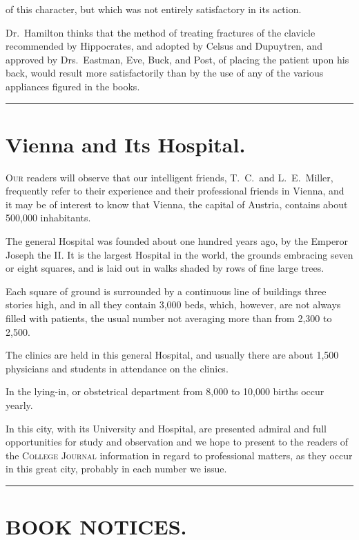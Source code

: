 of this character, but which was not entirely satisfactory in its
action.

Dr.~Hamilton thinks that the method of treating fractures of the clavicle
recommended by Hippocrates, and adopted by Celsus and Dupuytren,
and approved by Drs.~Eastman, Eve, Buck, and Post, of placing the
patient upon his back, would result more satisfactorily than by the use
of any of the various appliances figured in the books.

\fancybreak{*}

\section*{Vienna and Its Hospital.}

\lettrine[lines=1]{}{Our} readers will observe that our intelligent friends,  T.~C.\ and
L.~E.\ Miller, frequently refer to their experience and their professional
friends in Vienna, and it may be of interest to know that Vienna, the
capital of Austria, contains about 500,000 inhabitants.

The general Hospital was founded about one hundred years ago, by
the Emperor Joseph the II. It is the largest Hospital in the world,
the grounds embracing seven or eight squares, and is laid out in walks
shaded by rows of fine large trees.

Each square of ground is surrounded by a continuous line of buildings
three stories high, and in all they contain 3,000 beds, which, however,
are not always filled with patients, the usual number not averaging
more than from 2,300 to 2,500.

The clinics are held in this general Hospital, and usually there are
about 1,500 physicians and students in attendance on the clinics.

In the lying-in, or obstetrical department from 8,000 to 10,000 births
occur yearly.

In this city, with its University and Hospital, are presented admiral
and full opportunities for study and observation and we hope to present
to the readers of the \textsc{College Journal} information in regard to
professional matters, as they occur in this great city, probably in each
number we issue.

\fancybreak{*}

\section*{BOOK NOTICES.}

